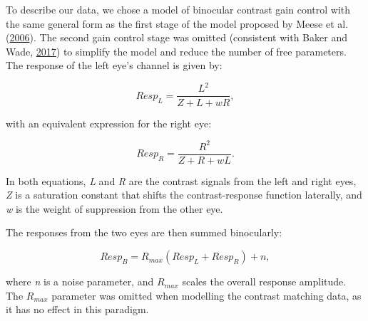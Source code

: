 \documentclass[
]{article}
\begin{document}
To describe our data, we chose a model of binocular contrast gain control with the same general form as the first stage of the model proposed by Meese et al. (\protect\hyperlink{ref-Meese2006}{2006}). The second gain control stage was omitted (consistent with Baker and Wade, \protect\hyperlink{ref-Baker2017}{2017}) to simplify the model and reduce the number of free parameters. The response of the left eye's channel is given by:

\begin{equation}
\label{eq:respL}
Resp_L = \frac{L^2}{Z + L + wR},
\end{equation}

with an equivalent expression for the right eye:

\begin{equation}
\label{eq:respR}
Resp_R = \frac{R^2}{Z + R + wL}.
\end{equation}

In both equations, \emph{L} and \emph{R} are the contrast signals from the left and right eyes, \emph{Z} is a saturation constant that shifts the contrast-response function laterally, and \emph{w} is the weight of suppression from the other eye.

The responses from the two eyes are then summed binocularly:

\begin{equation}
\label{eq:respB}
Resp_B = R_{max}(Resp_L + Resp_R) + n,
\end{equation}

where \emph{n} is a noise parameter, and \(R_{max}\) scales the overall response amplitude. The \(R_{max}\) parameter was omitted when modelling the contrast matching data, as it has no effect in this paradigm.
\end{document}
